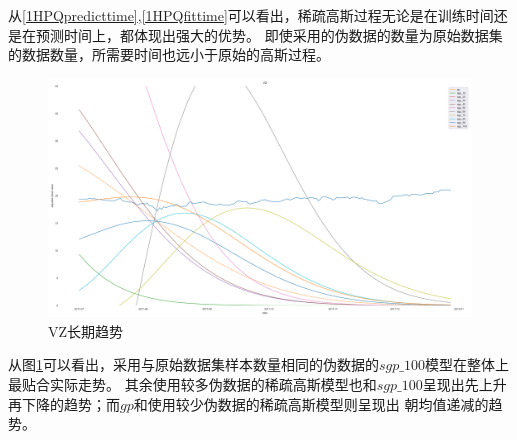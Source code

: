 从\ref{1HPQpredicttime},\ref{1HPQfittime}可以看出，稀疏高斯过程无论是在训练时间还是在预测时间上，都体现出强大的优势。
即使采用的伪数据的数量为原始数据集的数据数量，所需要时间也远小于原始的高斯过程。


\begin{figure}[!htbp]
    \centering
    \includegraphics[width=\textwidth]{images/lab1/VZ_trend.png}
    \caption{VZ长期趋势}\label{1lab1VZtrend}
\end{figure}

从图\ref{1lab1VZtrend}可以看出，采用与原始数据集样本数量相同的伪数据的$sgp\_100$模型在整体上最贴合实际走势。
其余使用较多伪数据的稀疏高斯模型也和$sgp\_100$呈现出先上升再下降的趋势；而$gp$和使用较少伪数据的稀疏高斯模型则呈现出
朝均值递减的趋势。

